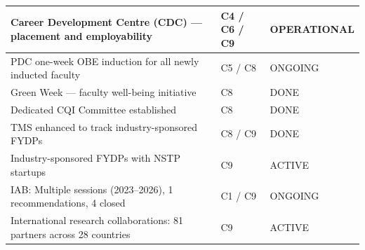 \begin{longtable}{|p{6.7cm}|p{1.8cm}|p{6.5cm}|}
Career Development Centre (CDC) --- placement and employability
& C4 / C6 / C9
& OPERATIONAL \\
\hline

PDC one-week OBE induction for all newly inducted faculty
& C5 / C8
& ONGOING \\
\hline

Green Week --- faculty well-being initiative
& C8
& DONE \\
\hline

Dedicated CQI Committee established
& C8
& DONE \\
\hline

TMS enhanced to track industry-sponsored FYDPs
& C8 / C9
& DONE \\
\hline

Industry-sponsored FYDPs with NSTP startups
& C9
& ACTIVE \\
\hline

IAB: Multiple sessions (2023--2026), 1 recommendations, 4 closed
& C1 / C9
& ONGOING \\
\hline

International research collaborations: 81 partners across 28 countries
& C9
& ACTIVE \\
\hline

\end{longtable}

\normalsize
\renewcommand{\arraystretch}{1.0}